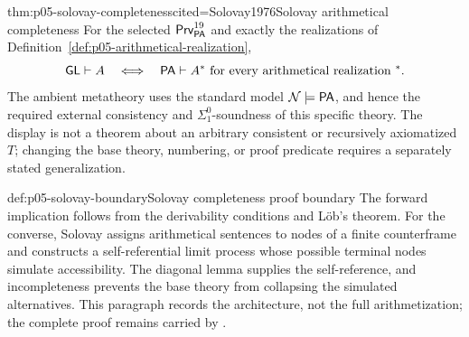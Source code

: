 \begin{hbtheorem}{thm:p05-solovay-completeness}{cited=Solovay1976}{Solovay arithmetical completeness}
For the selected \(\mathsf{Prv}^{19}_{\mathsf{PA}}\) and exactly the realizations of
Definition~\ref{def:p05-arithmetical-realization},
\[
 \mathsf{GL}\vdash A
 \quad\Longleftrightarrow\quad
 \mathsf{PA}\vdash A^*
 \text{ for every arithmetical realization }{^*}.
\]
The ambient metatheory uses the standard model
\(\mathcal N\models\mathsf{PA}\), and hence the required external consistency and
\(\Sigma^0_1\)-soundness of this specific theory.  The display is not a theorem
about an arbitrary consistent or recursively axiomatized \(T\); changing the
base theory, numbering, or proof predicate requires a separately stated
generalization.
\end{hbtheorem}

\begin{proofboundary}{def:p05-solovay-boundary}{Solovay completeness proof boundary}
The forward implication follows from the derivability conditions and L\"ob's
theorem.  For the converse, Solovay assigns arithmetical sentences to nodes of
a finite counterframe and constructs a self-referential limit process whose
possible terminal nodes simulate accessibility.  The diagonal lemma supplies
the self-reference, and incompleteness prevents the base theory from
collapsing the simulated alternatives.  This paragraph records the
architecture, not the full arithmetization; the complete proof remains carried
by \cite{Solovay1976,Boolos1993}.
\end{proofboundary}

